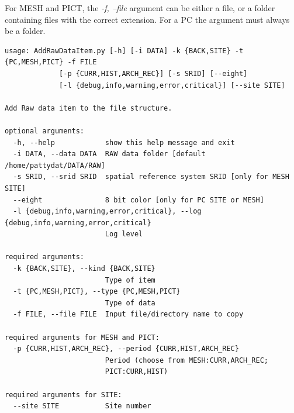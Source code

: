 For MESH and PICT, the \textit{-f, --file} argument can be either a file, or a folder containing files with the correct extension. For a PC the argument must always be a folder.

\begin{Verbatim}[fontfamily=courier,commandchars=\\\{\},fontsize=\footnotesize]
 usage: AddRawDataItem.py [-h] [-i DATA] -k {BACK,SITE} -t {PC,MESH,PICT} -f FILE                                                                                                     
             [-p {CURR,HIST,ARCH_REC}] [-s SRID] [--eight]
             [-l {debug,info,warning,error,critical}] [--site SITE]

Add Raw data item to the file structure.

optional arguments:
  -h, --help            show this help message and exit
  -i DATA, --data DATA  RAW data folder [default /home/pattydat/DATA/RAW]
  -s SRID, --srid SRID  spatial reference system SRID [only for MESH SITE]
  --eight               8 bit color [only for PC SITE or MESH]
  -l {debug,info,warning,error,critical}, --log {debug,info,warning,error,critical}
                        Log level

required arguments:
  -k {BACK,SITE}, --kind {BACK,SITE}
                        Type of item
  -t {PC,MESH,PICT}, --type {PC,MESH,PICT}
                        Type of data
  -f FILE, --file FILE  Input file/directory name to copy

required arguments for MESH and PICT:
  -p {CURR,HIST,ARCH_REC}, --period {CURR,HIST,ARCH_REC}
                        Period (choose from MESH:CURR,ARCH_REC;
                        PICT:CURR,HIST)

required arguments for SITE:
  --site SITE           Site number
\end{Verbatim}

